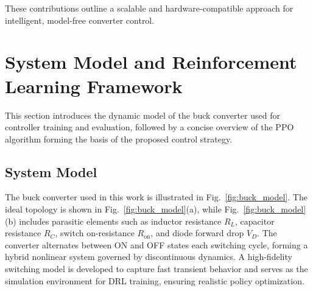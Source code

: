 \documentclass[conference]{IEEEtran}
\begin{document}
These contributions outline a scalable and hardware-compatible approach for intelligent, model-free converter control.



\section{System Model and Reinforcement Learning Framework}

This section introduces the dynamic model of the buck converter used for controller training and evaluation, followed by a concise overview of the PPO algorithm forming the basis of the proposed control strategy.

\subsection{System Model}

The buck converter used in this work is illustrated in Fig.~\ref{fig:buck_model}. The ideal topology is shown in Fig.~\ref{fig:buck_model}(a), while Fig.~\ref{fig:buck_model}(b) includes parasitic elements such as inductor resistance $R_L$, capacitor resistance $R_C$, switch on-resistance $R_{\text{on}}$, and diode forward drop $V_D$. The converter alternates between ON and OFF states each switching cycle, forming a hybrid nonlinear system governed by discontinuous dynamics. A high-fidelity switching model is developed to capture fast transient behavior and serves as the simulation environment for DRL training, ensuring realistic policy optimization.






\end{document}
